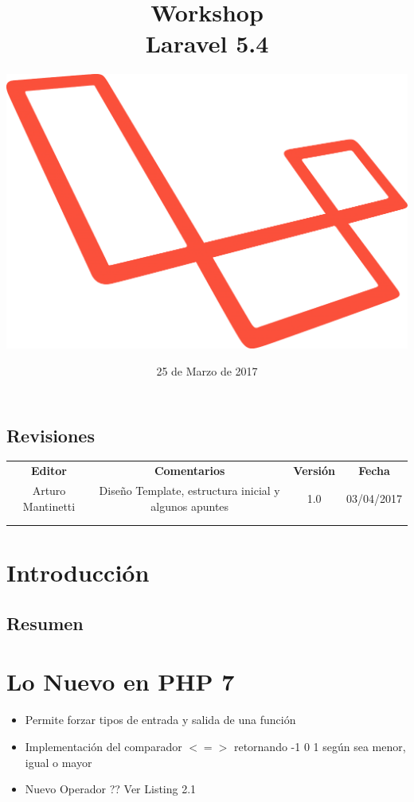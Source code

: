\documentclass[spanish]{theme/pclreport}
\title{Workshop \\ Laravel 5.4 }
\author{
\begin{figure}[H]
	\centering
	\includegraphics[scale=.2]{imagenes/laravel-logo.png}
\end{figure}}
\date{25 de Marzo de 2017}
\begin{document}
\maketitle

\newpage

\vspace*{\fill}
\section*{Revisiones}
\begin{table}[H]
\centering
\begin{tabular}{cccc}
\textbf{Editor}   &                 \textbf{Comentarios}                       & \textbf{Versión} & \textbf{Fecha}  \\
Arturo Mantinetti & Diseño Template, estructura inicial y algunos apuntes      & 1.0              & 03/04/2017      \\
                  &                                                            &                  &                 \\
                  &                                                            &                  &                               
\end{tabular}
\end{table}
\vspace*{\fill}


\thispagestyle{empty} 

\tableofcontents



\chapter{Introducción}


\section{Resumen}




\chapter{Lo Nuevo en PHP 7}

\begin{itemize}  
\item Permite forzar tipos de entrada y salida de una función
\item Implementación del comparador $<=>$ retornando -1 0 1 según sea menor, igual o mayor
\item Nuevo Operador ?? Ver Listing 2.1
\end{itemize}
\end{document}
